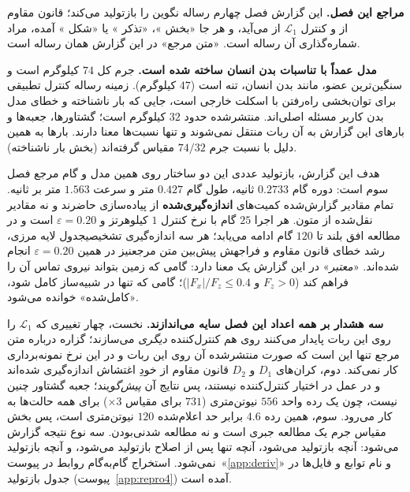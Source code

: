 \documentclass[10pt,twocolumn]{article}
\newcommand{\en}[1]{\lr{#1}}
\newcommand{\md}{\lr{\textemdash}}
\begin{document}
\textbf{مراجع این فصل.} این گزارش فصل چهارم رساله نگوین \cite{nguyen2017thesis} را بازتولید
می‌کند؛ قانون مقاوم از \cite{nguyen2015robust} و کنترل $\mathcal{L}_1$ از \cite{nguyen2015l1}
می‌آید، و هر جا «بخش \en{4.x}»، «تذکر \en{4.x}» یا «شکل \en{4.x}» آمده، مراد شماره‌گذاری آن
رساله است. «متن مرجع» در این گزارش همان رساله است.

\textbf{مدل عمداً با تناسبات بدن انسان ساخته شده است.} جرم کل $74$ کیلوگرم است و سنگین‌ترین
عضو، مانند بدن انسان، تنه است ($47$ کیلوگرم). زمینه رساله کنترل تطبیقی برای توان‌بخشی
راه‌رفتن با اسکلت خارجی است، جایی که بار ناشناخته و خطای مدل بدن کاربر مسئله اصلی‌اند.
\en{RABBIT} منتشرشده حدود $32$ کیلوگرم است؛ گشتاورها، جعبه‌ها و بارهای این گزارش به آن ربات
منتقل نمی‌شوند و تنها نسبت‌ها معنا دارند. بارها به همین دلیل با نسبت جرم $74/32$ مقیاس
گرفته‌اند (بخش بار ناشناخته).

هدف این گزارش، بازتولید عددی این دو ساختار روی همین مدل و گام مرجع فصل سوم است: دوره گام
$0.2733$ ثانیه، طول گام $0.427$ متر و سرعت $1.563$ متر بر ثانیه. تمام مقادیر گزارش‌شده
کمیت‌های \textbf{اندازه‌گیری‌شده} از پیاده‌سازی حاضرند و نه مقادیر نقل‌شده از متون. هر اجرا
$25$ گام با نرخ کنترل $1$ کیلوهرتز و $\varepsilon=0.20$ است و در مطالعه افق بلند تا $120$ گام
ادامه می‌یابد؛ هر سه اندازه‌گیری تشخیصی\md{}جدول لایه مرزی، رشد خطای قانون مقاوم و فراجهش
پیش‌بین متن مرجع\md{}نیز در همین $\varepsilon=0.20$ انجام شده‌اند. «\emph{معتبر}» در این گزارش
یک معنا دارد: گامی که زمین بتواند نیروی تماس آن را فراهم کند ($F_z>0$ و $|F_x|/F_z\le0.4$)؛
گامی که تنها در شبیه‌ساز کامل شود، «کامل‌شده» خوانده می‌شود.

\textbf{سه هشدار بر همه اعداد این فصل سایه می‌اندازند.} نخست، چهار تغییری که $\mathcal{L}_1$
را روی این ربات پایدار می‌کنند روی هم کنترل‌کننده \emph{دیگری} می‌سازند؛ گزاره درباره متن
مرجع تنها این است که صورت منتشرشده آن روی این ربات و در این نرخ نمونه‌برداری کار نمی‌کند.
دوم، کران‌های $D_1$ و $D_2$ قانون مقاوم از خودِ اغتشاش اندازه‌گیری شده‌اند و در عمل در اختیار
کنترل‌کننده نیستند، پس نتایج آن \emph{پیش‌گو}یند؛ جعبه گشتاور چنین نیست، چون یک رده واحد
$556$ نیوتن‌متری ($731$ برای مقیاس $\times3$) برای همه حالت‌ها به کار می‌رود. سوم، همین رده
$4.6$ برابر حد اعلام‌شده $120$ نیوتن‌متری است، پس بخش مقیاس جرم یک مطالعه جبری است و نه
مطالعه شدنی‌بودن. سه نوع نتیجه گزارش می‌شود: آنچه بازتولید می‌شود، آنچه تنها پس از اصلاح
بازتولید می‌شود، و آنچه بازتولید نمی‌شود. استخراج گام‌به‌گام روابط در
پیوست~«\ref{app:deriv}» و نام توابع و فایل‌ها در جدول بازتولید (پیوست~\ref{app:repro4})
آمده است.

\end{document}
